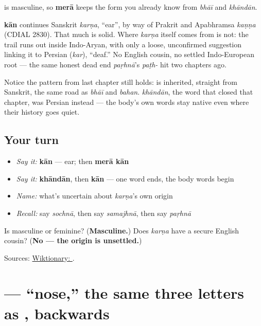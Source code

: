 \textbf{} is masculine, so \textbf{merā} keeps the form you already know from \emph{bhāī} and \emph{khāndān}.

\begin{cousinweb}
\textbf{kān} continues Sanskrit \emph{karṇa}, \textquotedblleft{}ear\textquotedblright{}, by way of Prakrit and Apabhramsa \emph{kaṇṇa} (CDIAL 2830). That much is solid. Where \emph{karṇa} itself comes from is not: the trail runs out inside Indo-Aryan, with only a loose, unconfirmed suggestion linking it to Persian \textbf{} (\emph{kar}), \textquotedblleft{}deaf.\textquotedblright{} No English cousin, no settled Indo-European root — the same honest dead end \emph{paṛhnā}'s \emph{paṭh-} hit two chapters ago.

Notice the pattern from last chapter still holds: \textbf{} is inherited, straight from Sanskrit, the same road as \emph{bhāī} and \emph{bahan}. \emph{khāndān}, the word that closed that chapter, was Persian instead — the body's own words stay native even where their history goes quiet.
\end{cousinweb}

\subsection*{Your turn}
\begin{itemize}
\raggedright
  \item \emph{Say it:} \textbf{kān} — ear; then \textbf{merā kān}
  \item \emph{Say it:} \textbf{khāndān}, then \textbf{kān} — one word ends, the body words begin
  \item \emph{Name:} what's uncertain about \emph{karṇa}'s own origin
  \item \emph{Recall:} say \emph{sochnā}, then say \emph{samajhnā}, then say \emph{paṛhnā}
\end{itemize}

\begin{tcolorbox}[breakable,colback=teal!4,colframe=teal!35!black,title={Before you move on}]
Is \textbf{} masculine or feminine? (\textbf{Masculine.}) Does \emph{karṇa} have a secure English cousin? (\textbf{No — the origin is unsettled.})

Sources: \href{https://en.wiktionary.org/wiki/\%DA\%A9\%D8\%A7\%D9\%86}{Wiktionary: }.
\end{tcolorbox}
\section[\texorpdfstring{\ur{ناک} (nāk)}{ناک (nāk)}]{ — \textquotedblleft{}nose,\textquotedblright{} the same three letters as , backwards}


